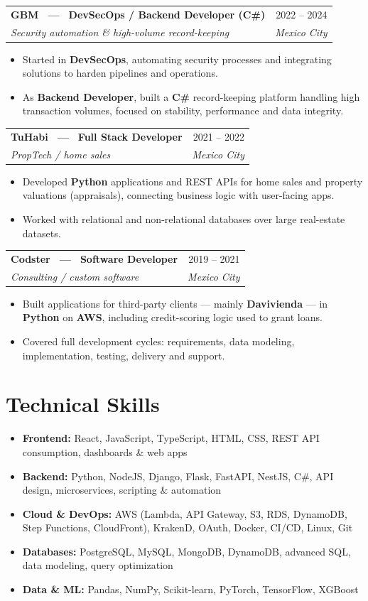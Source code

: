 \documentclass[11pt,a4paper]{article}
\makeatletter
\newcommand{\cventry}[4]{%
  \begin{tabularx}{\linewidth}{@{}X r@{}}
    \textbf{#1} & {\color{muted}#2}\\[2pt]
    {\color{muted}\itshape #3} & {\color{muted}\itshape #4}\\
  \end{tabularx}%
  \vspace{-0.05em}%
}
\makeatother
\begin{document}
\cventry{GBM \, — \, DevSecOps / Backend Developer (C\#)}{2022 -- 2024}{Security automation \& high-volume record-keeping}{Mexico City}
\begin{itemize}
  \item Started in \textbf{DevSecOps}, automating security processes and integrating solutions to harden pipelines and operations.
  \item As \textbf{Backend Developer}, built a \textbf{C\#} record-keeping platform handling high transaction volumes, focused on stability, performance and data integrity.
\end{itemize}

\cventry{TuHabi \, — \, Full Stack Developer}{2021 -- 2022}{PropTech / home sales}{Mexico City}
\begin{itemize}
  \item Developed \textbf{Python} applications and REST APIs for home sales and property valuations (appraisals), connecting business logic with user-facing apps.
  \item Worked with relational and non-relational databases over large real-estate datasets.
\end{itemize}

\cventry{Codster \, — \, Software Developer}{2019 -- 2021}{Consulting / custom software}{Mexico City}
\begin{itemize}
  \item Built applications for third-party clients — mainly \textbf{Davivienda} — in \textbf{Python} on \textbf{AWS}, including credit-scoring logic used to grant loans.
  \item Covered full development cycles: requirements, data modeling, implementation, testing, delivery and support.
\end{itemize}

\section{Technical Skills}
\begin{itemize}[label={}, leftmargin=0em, itemsep=3pt]
  \item \textbf{Frontend:} React, JavaScript, TypeScript, HTML, CSS, REST API consumption, dashboards \& web apps
  \item \textbf{Backend:} Python, NodeJS, Django, Flask, FastAPI, NestJS, C\#, API design, microservices, scripting \& automation
  \item \textbf{Cloud \& DevOps:} AWS (Lambda, API Gateway, S3, RDS, DynamoDB, Step Functions, CloudFront), KrakenD, OAuth, Docker, CI/CD, Linux, Git
  \item \textbf{Databases:} PostgreSQL, MySQL, MongoDB, DynamoDB, advanced SQL, data modeling, query optimization
  \item \textbf{Data \& ML:} Pandas, NumPy, Scikit-learn, PyTorch, TensorFlow, XGBoost
\end{itemize}
\end{document}
